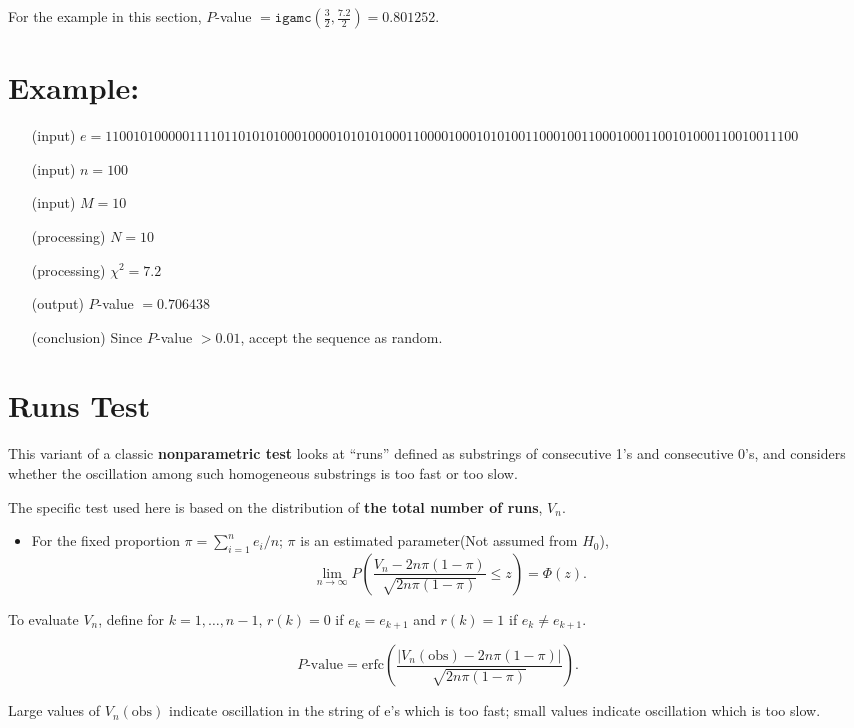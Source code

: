 \documentclass[12pt,openany]{book}
\theoremstyle{definition}
\begin{document}
	For the example in this section, \( P \)-value \( = \texttt{igamc} \left( \frac{3}{2}, \frac{7.2}{2} \right) = 0.801252 \).
	
	\section*{Example:}
	\begin{itemize}
		\item[(input)] \( e = 110010100000111101101010100010000101010100011000010001010100110001001100010001100101000110010011100 \)
		\item[(input)] \( n = 100 \)
		\item[(input)] \( M = 10 \)
		\item[(processing)] \( N = 10 \)
		\item[(processing)] \( \chi^2 = 7.2 \)
		\item[(output)] \( P \)-value \( = 0.706438 \)
		\item[(conclusion)] Since \( P \)-value \( > 0.01 \), accept the sequence as random.
	\end{itemize}

	\section*{Runs Test}
	
	This variant of a classic \textbf{nonparametric test} looks at ``runs'' defined as substrings of consecutive 1's and consecutive 0's, and considers whether the oscillation among such homogeneous substrings is too fast or too slow.
	
	The specific test used here is based on the distribution of \textbf{the total number of runs}, \( V_n \).
	\begin{itemize}
		\item For the fixed proportion \( \pi = \sum_{i=1}^{n} e_i / n \); \( \pi \) is an estimated parameter(Not assumed from \( H_0 \)),
		\[
		\lim_{n \to \infty} P\left(\frac{V_n - 2n\pi(1 - \pi)}{\sqrt{2n\pi(1 - \pi)}} \leq z\right) = \Phi(z).
		\]
	\end{itemize}
	
	To evaluate \( V_n \), define for \( k = 1, \ldots, n-1 \), \( r(k) = 0 \) if \( e_k = e_{k+1} \) and \( r(k) = 1 \) if \( e_k \neq e_{k+1} \).
	
	\[
	P\text{-value} = \text{erfc}\left(\frac{|V_n(\text{obs}) - 2n\pi(1 - \pi)|}{\sqrt{2n\pi(1 - \pi)}}\right).
	\]
	
	Large values of \( V_n(\text{obs}) \) indicate oscillation in the string of e's which is too fast; small values indicate oscillation which is too slow.
	
\end{document}
